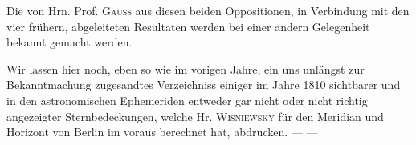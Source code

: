 \par\indent Die von Hrn. Prof. \textsc{Gauss} aus diesen beiden Oppositionen, in Verbindung mit den vier frühern, abgeleiteten Resultaten werden bei einer andern Gelegenheit bekannt gemacht werden.

Wir lassen hier noch, eben so wie im vorigen Jahre, ein uns unlängst zur Bekanntmachung zugesandtes Verzeichniss einiger im Jahre 1810 sichtbarer und in den astronomischen Ephemeriden entweder gar nicht oder nicht richtig angezeigter Sternbedeckungen, welche Hr. \textsc{Wisniewsky} für den Meridian und Horizont von Berlin im voraus berechnet hat, abdrucken. --- ---
